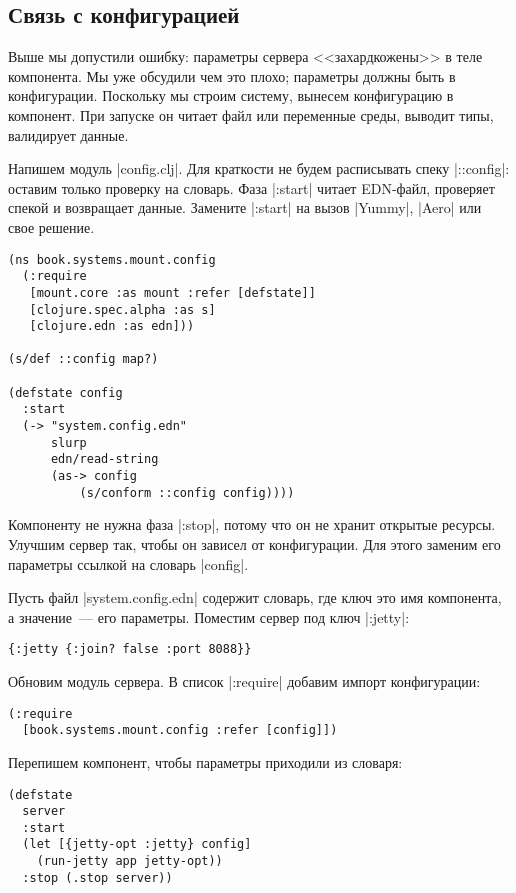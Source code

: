 \subsection{Связь с конфигурацией}

Выше мы допустили ошибку: параметры сервера <<захардкожены>> в теле
компонента. Мы уже обсудили чем это плохо; параметры должны быть в
конфигурации. Поскольку мы строим систему, вынесем конфигурацию в компонент. При
запуске он читает файл или переменные среды, выводит типы, валидирует данные.


Напишем модуль \spverb|config.clj|. Для краткости не будем расписывать спеку
\spverb|::config|: оставим только проверку на словарь. Фаза \spverb|:start|
читает EDN-файл, проверяет спекой и возвращает данные. Замените \spverb|:start|
на вызов \spverb|Yummy|, \spverb|Aero| или свое решение.

\begin{verbatim}
(ns book.systems.mount.config
  (:require
   [mount.core :as mount :refer [defstate]]
   [clojure.spec.alpha :as s]
   [clojure.edn :as edn]))

(s/def ::config map?)

(defstate config
  :start
  (-> "system.config.edn"
      slurp
      edn/read-string
      (as-> config
          (s/conform ::config config))))
\end{verbatim}

Компоненту не нужна фаза \spverb|:stop|, потому что он не хранит открытые
ресурсы. Улучшим сервер так, чтобы он зависел от конфигурации. Для этого заменим
его параметры ссылкой на словарь \spverb|config|.

Пусть файл \spverb|system.config.edn| содержит словарь, где ключ это имя
компонента, а значение~--- его параметры. Поместим сервер под ключ
\spverb|:jetty|:

\begin{verbatim}
{:jetty {:join? false :port 8088}}
\end{verbatim}

Обновим модуль сервера. В список \spverb|:require| добавим импорт конфигурации:

\begin{verbatim}
(:require
  [book.systems.mount.config :refer [config]])
\end{verbatim}

\noindent
Перепишем компонент, чтобы параметры приходили из словаря:

\begin{verbatim}
(defstate
  server
  :start
  (let [{jetty-opt :jetty} config]
    (run-jetty app jetty-opt))
  :stop (.stop server))
\end{verbatim}

